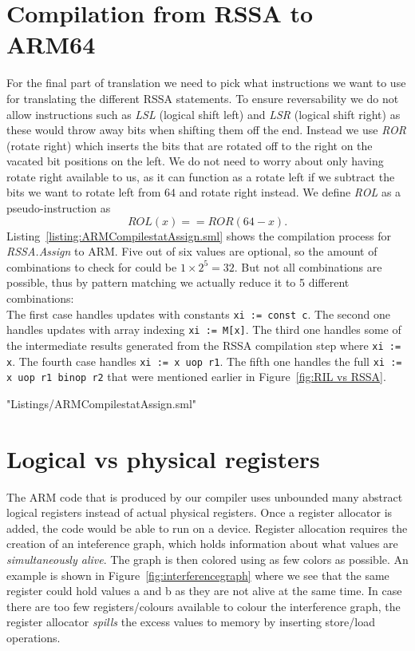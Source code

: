 \section{Compilation from RSSA to ARM64}
For the final part of translation we need to pick what instructions we want to use for translating the different RSSA statements.
To ensure reversability we do not allow instructions such as \emph{LSL} (logical shift left) and \emph{LSR} (logical shift right) as these would throw away bits when shifting them off the end.
Instead we use \emph{ROR} (rotate right) which inserts the bits that are rotated off to the right on the vacated bit positions on the left.
We do not need to worry about only having rotate right available to us, as it can function as a rotate left if we subtract the bits we want to rotate left from $64$ and rotate right instead.
We define \emph{ROL} as a pseudo-instruction as
\begin{equation*}
  ROL(x) == ROR(64-x).
\end{equation*}
Listing~\ref{listing:ARMCompilestatAssign.sml} shows the compilation process for \emph{RSSA.Assign} to ARM.
Five out of six values are optional, so the amount of combinations to check for could be $1 \times 2^5 = 32$.
But not all combinations are possible, thus by pattern matching we actually reduce it to 5 different combinations:\\
The first case handles updates with constants \lstinline{xi := const c}.
The second one handles updates with array indexing \lstinline{xi := M[x]}.
The third one handles some of the intermediate results generated from the RSSA compilation step where \lstinline{xi := x}.
The fourth case handles \lstinline{xi := x uop r1}.
The fifth one handles the full \lstinline{xi := x uop r1 binop r2} that were mentioned earlier in Figure~\ref{fig:RIL vs RSSA}.

 {"Listings/ARMCompilestatAssign.sml"}

\section{Logical vs physical registers}
The ARM code that is produced by our compiler uses unbounded many abstract logical registers instead of actual physical registers.
Once a register allocator is added, the code would be able to run on a device.
Register allocation requires the creation of an inteference graph, which holds information about what values are \emph{simultaneously alive}. The graph is then colored using as few colors as possible. An example is shown in Figure~\ref{fig:interferencegraph} where we see that the same register could hold values a and b as they are not alive at the same time.
In case there are too few registers/colours available to colour the interference graph, the register allocator \emph{spills} the excess values to memory by inserting store/load operations.

